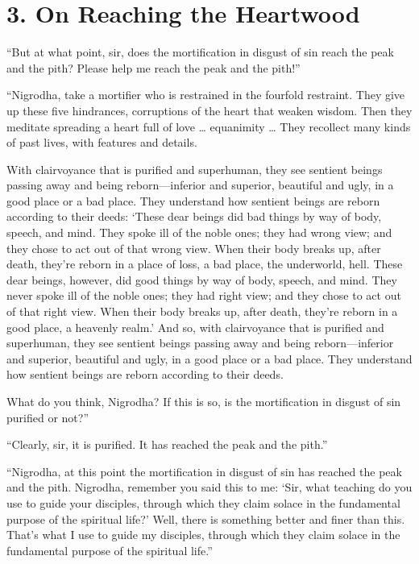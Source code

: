 \documentclass[12pt,openany]{book}%
\begin{document}
\section*{3. On Reaching the Heartwood }

“But at what point, sir, does the mortification in disgust of sin reach the peak and the pith? Please help me reach the peak and the pith!” 

“Nigrodha, take a mortifier who is restrained in the fourfold restraint. They give up these five hindrances, corruptions of the heart that weaken wisdom. Then they meditate spreading a heart full of love … equanimity … They recollect many kinds of past lives, with features and details. 

With clairvoyance that is purified and superhuman, they see sentient beings passing away and being reborn—inferior and superior, beautiful and ugly, in a good place or a bad place. They understand how sentient beings are reborn according to their deeds: ‘These dear beings did bad things by way of body, speech, and mind. They spoke ill of the noble ones; they had wrong view; and they chose to act out of that wrong view. When their body breaks up, after death, they’re reborn in a place of loss, a bad place, the underworld, hell. These dear beings, however, did good things by way of body, speech, and mind. They never spoke ill of the noble ones; they had right view; and they chose to act out of that right view. When their body breaks up, after death, they’re reborn in a good place, a heavenly realm.’ And so, with clairvoyance that is purified and superhuman, they see sentient beings passing away and being reborn—inferior and superior, beautiful and ugly, in a good place or a bad place. They understand how sentient beings are reborn according to their deeds. 

What do you think, Nigrodha? If this is so, is the mortification in disgust of sin purified or not?” 

“Clearly, sir, it is purified. It has reached the peak and the pith.” 

“Nigrodha, at this point the mortification in disgust of sin has reached the peak and the pith. Nigrodha, remember you said this to me: ‘Sir, what teaching do you use to guide your disciples, through which they claim solace in the fundamental purpose of the spiritual life?’ Well, there is something better and finer than this. That’s what I use to guide my disciples, through which they claim solace in the fundamental purpose of the spiritual life.” 
\end{document}
